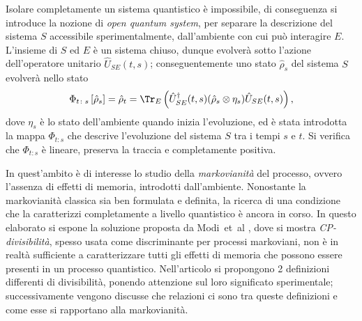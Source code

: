 
Isolare completamente un sistema quantistico è impossibile, di conseguenza si introduce la nozione di \emph{open quantum system}, per separare la descrizione del sistema \(S\) accessibile sperimentalmente, dall'ambiente con cui può interagire \(E\). L'insieme di \(S\) ed \(E\) è un sistema chiuso, dunque evolverà sotto l'azione dell'operatore unitario \(\hat{U}_{SE}(t,s)\); conseguentemente uno stato \(\hat{\rho}_s\) del sistema \(S\) evolverà nello stato
\[\Phi_{t\colon s}\left[\hat{\rho}_s\right]=\hat{\rho}_t = \Tr_E\left(\hat{U}^\dag_{SE}(t,s)(\hat{\rho}_s\otimes\eta_s)\hat{U}_{SE}(t,s)\right),\]
dove \(\eta_s\) è lo stato dell'ambiente quando inizia l'evoluzione, ed è stata introdotta la mappa \(\Phi_{t\colon s}\) che descrive l'evoluzione del sistema \(S\) tra i tempi \(s\) e \(t\). Si verifica che \(\Phi_{t\colon s}\) è lineare, preserva la traccia e completamente positiva.

In quest'ambito è di interesse lo studio della \emph{markovianità} del processo, ovvero l'assenza di effetti di memoria, introdotti dall'ambiente. Nonostante la markovianità classica sia ben formulata e definita, la ricerca di una condizione che la caratterizzi completamente a livello quantistico è ancora in corso. In questo elaborato si espone la soluzione proposta da Modi~et~al \cite{CPdoesnotimply}, dove si mostra \emph{CP-divisibilità}, spesso usata come discriminante per processi markoviani, non è in realtà sufficiente a caratterizzare tutti gli effetti di memoria che possono essere presenti in un processo quantistico. Nell'articolo si propongono 2 definizioni differenti di divisibilità, ponendo attenzione sul loro significato sperimentale; successivamente vengono discusse che relazioni ci sono tra queste definizioni e come esse si rapportano alla markovianità.


